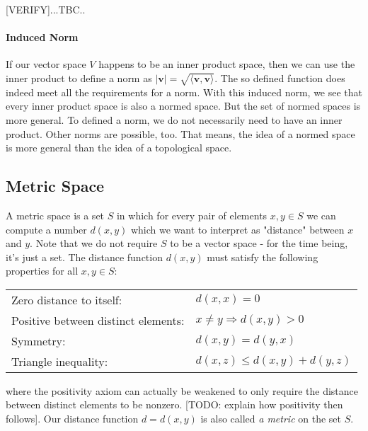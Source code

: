 [VERIFY]...TBC..


\paragraph{Induced Norm}
If our vector space $V$ happens to be an inner product space, then we can use the inner product to define a norm as $|\mathbf{v}| = \sqrt{\langle \mathbf{v,v}  \rangle}$. The so defined function does indeed meet all the requirements for a norm. With this induced norm, we see that every inner product space is also a normed space. But the set of normed spaces is more general. To defined a norm, we do not necessarily need to have an inner product. Other norms are possible, too. That means, the idea of a normed space is more general than the idea of a topological space.


\subsection{Metric Space}
A metric space is a set $S$ in which for every pair of elements $x,y \in S$ we can compute a number $d(x,y)$ which we want to interpret as "distance" between $x$ and $y$. Note that we do not require $S$ to be a vector space - for the time being, it's just a set. The distance function $d(x,y)$ must satisfy the following properties for all $x,y \in S$:

\medskip
\begin{tabular}{l l}
Zero distance to itself:            & $d(x, x) = 0$  \\
Positive between distinct elements: & $x \neq y \Rightarrow d(x,y) > 0$  \\
Symmetry:                           & $d(x, y) = d(y, x)$  \\
Triangle inequality:                & $d(x,z) \leq d(x,y) + d(y,z)$
\end{tabular}
\medskip
where the positivity axiom can actually be weakened to only require the distance between distinct elements to be nonzero. [TODO: explain how positivity then follows]. Our distance function $d = d(x,y)$ is also called \emph{a metric} on the set $S$.


